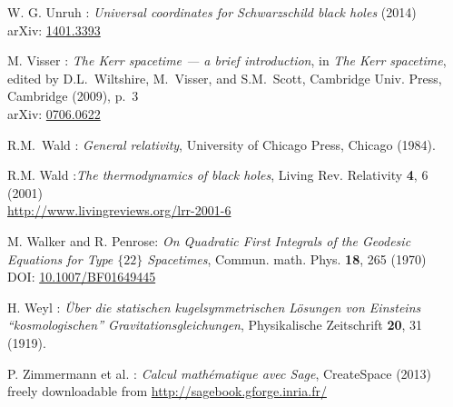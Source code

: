 \begin{thebibliography}{123}
W. G. Unruh : {\em Universal coordinates for Schwarzschild black holes} (2014)\\
arXiv: \href{https://arxiv.org/abs/1401.3393}{1401.3393}

M. Visser : {\em The Kerr spacetime --- a brief introduction},
in {\em The Kerr spacetime}, edited by D.L.~Wiltshire, M.~Visser, and S.M.~Scott,
Cambridge Univ. Press, Cambridge (2009), p.~3\\
arXiv: \href{https://arxiv.org/abs/0706.0622}{0706.0622}

R.M.~Wald : {\em General relativity},
University of Chicago Press, Chicago (1984).

R.M. Wald :{\em The thermodynamics of black holes},
Living Rev. Relativity {\bf 4}, 6 (2001) \\
\url{http://www.livingreviews.org/lrr-2001-6}

M. Walker and R. Penrose: {\em On Quadratic First Integrals of the Geodesic Equations
for Type $\{22\}$ Spacetimes},
Commun. math. Phys. {\bf 18}, 265 (1970)\\
DOI: \href{https://doi.org/10.1007/BF01649445}{10.1007/BF01649445}

H. Weyl : {\em \"Uber die statischen kugelsymmetrischen L\"osungen von Einsteins ``kosmologischen'' Gravitationsgleichungen},
Physikalische Zeitschrift {\bf 20}, 31 (1919).

P. Zimmermann et al. : {\em Calcul math\'ematique avec Sage}, CreateSpace (2013) \\
freely downloadable from \url{http://sagebook.gforge.inria.fr/}

\end{thebibliography}
